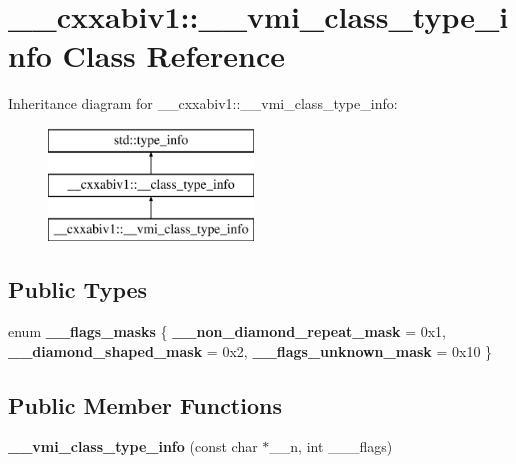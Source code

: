 \hypertarget{class____cxxabiv1_1_1____vmi__class__type__info}{\section{\+\_\+\+\_\+cxxabiv1\+:\+:\+\_\+\+\_\+vmi\+\_\+class\+\_\+type\+\_\+info Class Reference}
\label{class____cxxabiv1_1_1____vmi__class__type__info}
}
Inheritance diagram for \+\_\+\+\_\+cxxabiv1\+:\+:\+\_\+\+\_\+vmi\+\_\+class\+\_\+type\+\_\+info\+:\begin{figure}[H]
\begin{center}
\leavevmode
\includegraphics[height=3.000000cm]{class____cxxabiv1_1_1____vmi__class__type__info}
\end{center}
\end{figure}
\subsection*{Public Types}
\begin{DoxyCompactItemize}
\item 
\hypertarget{class____cxxabiv1_1_1____vmi__class__type__info_ad318d6d969e72c1084f6c6d4dd25f0d5}{enum {\bfseries \+\_\+\+\_\+flags\+\_\+masks} \{ {\bfseries \+\_\+\+\_\+non\+\_\+diamond\+\_\+repeat\+\_\+mask} = 0x1, 
{\bfseries \+\_\+\+\_\+diamond\+\_\+shaped\+\_\+mask} = 0x2, 
{\bfseries \+\_\+\+\_\+flags\+\_\+unknown\+\_\+mask} = 0x10
 \}}\label{class____cxxabiv1_1_1____vmi__class__type__info_ad318d6d969e72c1084f6c6d4dd25f0d5}

\end{DoxyCompactItemize}
\subsection*{Public Member Functions}
\begin{DoxyCompactItemize}
\item 
\hypertarget{class____cxxabiv1_1_1____vmi__class__type__info_aa4d337ac9d6fb609ef55c234620bd307}{{\bfseries \+\_\+\+\_\+vmi\+\_\+class\+\_\+type\+\_\+info} (const char $\ast$\+\_\+\+\_\+n, int \+\_\+\+\_\+\+\_\+flags)}\label{class____cxxabiv1_1_1____vmi__class__type__info_aa4d337ac9d6fb609ef55c234620bd307}

\end{DoxyCompactItemize}
